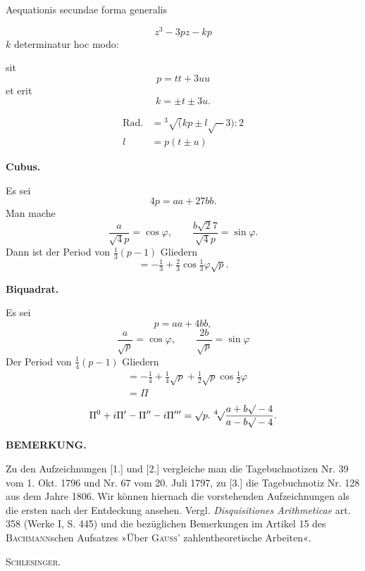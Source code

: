 \noindent\hspace*{\parindent}Aequationis secundae forma generalis
\par\medskip
\noindent\begin{minipage}[t]{.49\linewidth}
\[z^3-3pz-kp\]
\noindent $k$ determinatur hoc modo:\par
\noindent sit
\[p=tt+3uu\]
\noindent et erit
\[k=\pm t\pm3u.\]
\end{minipage}\hfill
\begin{minipage}[t]{.49\linewidth}
\[\begin{aligned}
\text{Rad.}&={}^3\!\surd(kp\pm l\surd-3):2\\
l&=p(t\pm u)
\end{aligned}\]
\end{minipage}
\begin{center}\textbf{Cubus.}\end{center}
\noindent\hspace*{\parindent}Es sei
\[4p=aa+27bb.\]
\noindent Man mache
\[\frac a{\surd4p}=\cos\varphi,\qquad\frac{b\surd27}{\surd4p}=\sin\varphi.\]
\noindent Dann ist der Period von $\frac13(p-1)$ Gliedern
\[=-\tfrac13+\tfrac23\cos\tfrac13\varphi\surd p.\]
\begin{center}\textbf{Biquadrat.}\end{center}
\noindent\hspace*{\parindent}Es sei
\[p=aa+4bb,\]
\[\frac a{\surd p}=\cos\varphi,\qquad\frac{2b}{\surd p}=\sin\varphi\]
\clearpage
{}
\noindent Der Period von $\frac14(p-1)$ Gliedern
\[\begin{aligned}
&=-\tfrac14+\tfrac14\surd p+\tfrac12\surd p\cos\tfrac12\varphi\\
&=\Pi
\end{aligned}\]
\[\Pi^0+i\Pi'-\Pi''-i\Pi'''=\surd p\mathpunct{.}\,{}^4\!\surd\frac{a+b\surd-4}{a-b\surd-4}.\]
\begin{center}\textbf{BEMERKUNG.}\end{center}
\begingroup\small
\noindent\hspace*{\parindent}Zu den Aufzeichnungen [1.] und [2.] vergleiche man die Tagebuchnotizen Nr. 39
vom 1. Okt. 1796 und Nr. 67 vom 20. Juli 1797, zu [3.] die Tagebuchnotiz Nr. 128 aus dem Jahre 1806.
Wir können hiernach die vorstehenden Aufzeichnungen als die ersten nach der Entdeckung ansehen.
Vergl. \textit{Disquisitiones Arithmeticae} art. 358 (Werke I, S. 445) und die bezüglichen Bemerkungen
im Artikel 15 des \textsc{Bachmann}schen Aufsatzes »Über \textsc{Gauss}’ zahlentheoretische Arbeiten«.
\par\noindent\hfill\textsc{Schlesinger}.\par
\endgroup
\ClosingRule
\clearpage
